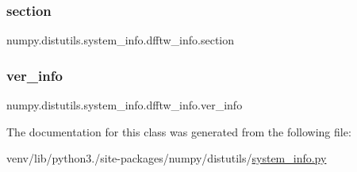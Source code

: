 \subsubsection{\texorpdfstring{section}{section}}
{\footnotesize\ttfamily numpy.\+distutils.\+system\+\_\+info.\+dfftw\+\_\+info.\+section\hspace{0.3cm}{\ttfamily [static]}}

\mbox{\label{classnumpy_1_1distutils_1_1system__info_1_1dfftw__info_aeaae8062bcf642bfd600ced4d920fdb4}} 
\subsubsection{\texorpdfstring{ver\+\_\+info}{ver\_info}}
{\footnotesize\ttfamily numpy.\+distutils.\+system\+\_\+info.\+dfftw\+\_\+info.\+ver\+\_\+info\hspace{0.3cm}{\ttfamily [static]}}



The documentation for this class was generated from the following file\+:\begin{DoxyCompactItemize}
\item 
venv/lib/python3./site-\/packages/numpy/distutils/\hyperlink{system__info_8py}{system\+\_\+info.\+py}\end{DoxyCompactItemize}
